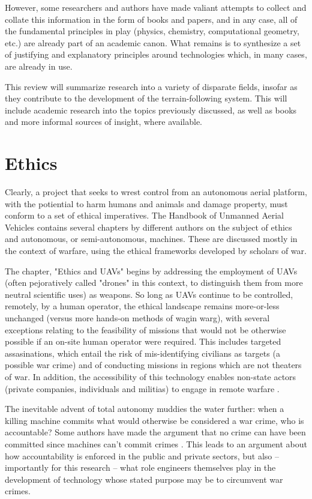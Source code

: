 \documentclass[10pt]{article}
\begin{document}
However, some researchers and authors have made valiant attempts to collect and collate this information in the form of books and papers, and in any case, all of the fundamental principles in play (physics, chemistry, computational geometry, etc.) are already part of an academic canon. What remains is to synthesize a set of justifying and explanatory principles around technologies which, in many cases, are already in use.

This review will summarize research into a variety of disparate fields, insofar as they contribute to the development of the terrain-following system. This will include academic research into the topics previously discussed, as well as books and more informal sources of insight, where available.


\section{Ethics}

Clearly, a project that seeks to wrest control from an autonomous aerial platform, with the potiential to harm humans and animals and damage property, must conform to a set of ethical imperatives. The Handbook of Unmanned Aerial Vehicles \cite{Valavanis2015} contains several chapters by different authors on the subject of ethics and autonomous, or semi-autonomous, machines. These are discussed mostly in the context of warfare, using the ethical frameworks developed by scholars of war.

The chapter, "Ethics and UAVs" begins by addressing the employment of UAVs (often pejoratively called "drones" in this context, to distinguish them from more neutral scientific uses) as weapons. So long as UAVs continue to be controlled, remotely, by a human operator, the ethical landscape remains more-or-less unchanged (versus more hands-on methods of wagin warg), with several exceptions relating to the feasibility of missions that would not be otherwise possible if an on-site human operator were required. This includes targeted assasinations, which entail the risk of mis-identifying civilians as targets (a possible war crime) and of conducting missions in regions which are not theaters of war. In addition, the accessibility of this technology enables non-state actors (private companies, individuals and militias) to engage in remote warfare \cite[p.2867]{Valavanis2015j}. 

The inevitable advent of total autonomy muddies the water further: when a killing machine commits what would otherwise be considered a war crime, who is accountable? Some authors have made the argument that no crime can have been committed since machines can't commit crimes \cite[p.2868]{Valavanis2015j}. This leads to an argument about how accountability is enforced in the public and private sectors, but also -- importantly for this research -- what role engineers themselves play in the development of technology whose stated purpose may be to circumvent war crimes.
\end{document}
